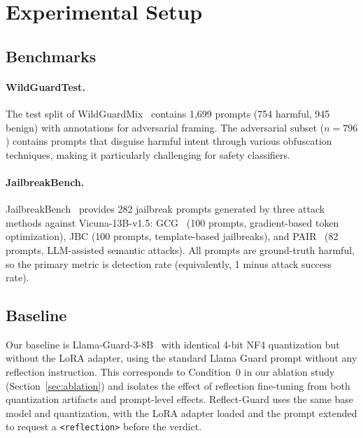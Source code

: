\documentclass[ai,article,submit,pdftex,moreauthors]{Definitions/mdpi}
\begin{document}
\section{Experimental Setup}

\subsection{Benchmarks}

\paragraph{WildGuardTest.} The test split of WildGuardMix~\citep{han2024wildguard} contains 1{,}699 prompts (754 harmful, 945 benign) with annotations for adversarial framing. The adversarial subset ($n = 796$) contains prompts that disguise harmful intent through various obfuscation techniques, making it particularly challenging for safety classifiers.

\paragraph{JailbreakBench.} JailbreakBench~\citep{chao2024jailbreakbench} provides 282 jailbreak prompts generated by three attack methods against Vicuna-13B-v1.5: GCG~\citep{zou2023universal} (100 prompts, gradient-based token optimization), JBC (100 prompts, template-based jailbreaks), and PAIR~\citep{chao2023jailbreaking} (82 prompts, LLM-assisted semantic attacks). All prompts are ground-truth harmful, so the primary metric is detection rate (equivalently, 1 minus attack success rate).

\subsection{Baseline}

Our baseline is Llama-Guard-3-8B~\citep{metallamaguard3} with identical 4-bit NF4 quantization but without the LoRA adapter, using the standard Llama Guard prompt without any reflection instruction. This corresponds to Condition~0 in our ablation study (Section~\ref{sec:ablation}) and isolates the effect of reflection fine-tuning from both quantization artifacts and prompt-level effects. Reflect-Guard uses the same base model and quantization, with the LoRA adapter loaded and the prompt extended to request a \texttt{<reflection>} before the verdict.
\end{document}
